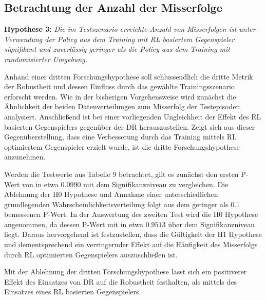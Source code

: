 \subsection{Betrachtung der Anzahl der Misserfolge}

\textbf{Hypothese 3:}
\textit{Die im Testszenario erreichte Anzahl von Misserfolgen ist unter Verwendung der Policy aus dem Training mit RL basiertem Gegenspieler signifikant und zuverlässig geringer als die Policy aus dem Training mit randomisierter Umgebung.}

Anhand einer dritten Forschungshypothese soll schlussendlich die dritte Metrik der Robustheit und dessen Einfluss durch das gewählte Trainingsszenario erforscht werden.
Wie in der bisherigen Vorgehensweise wird zunächst die Ähnlichkeit der beiden Datenverteilungen zum Misserfolg der Testepisoden analysiert.
Anschließend ist bei einer vorliegenden Ungleichheit der Effekt des RL basierten Gegenspielers gegenüber der DR herauszustellen.
Zeigt sich aus dieser Gegenüberstellung, dass eine Verbesserung durch das Training mittels RL optimiertem Gegenspieler erzielt wurde, ist die dritte Forschungshypothese anzunehmen. 

Werden die Testwerte aus Tabelle 9 betrachtet, gilt es zunächst den ersten P-Wert von in etwa $0.0990$ mit dem Signifikanzniveau zu vergleichen.
Die Ablehnung der H0 Hypothese und Annahme einer unterschiedlichen grundlegenden Wahrscheinlichkeitsverteilung folgt aus dem geringer als $0.1$ bemessenen P-Wert.
In der Auswertung des zweiten Test wird die H0 Hypothese angenommen, da dessen P-Wert mit in etwa $0.9513$ über dem Signifikanzniveau liegt.
Daraus hervorgehend ist festzustellen, dass die Gültigkeit der H1 Hypothese und dementsprechend ein verringernder Effekt auf die Häufigkeit des Misserfolgs durch RL optimierten Gegenspielers auszuschließen ist.

Mit der Ablehnung der dritten Forschungshypothese lässt sich ein positiverer Effekt des Einsatzes von DR auf die Robustheit festhalten, als mittels des Einsatzes eines RL basierten Gegenspielers.